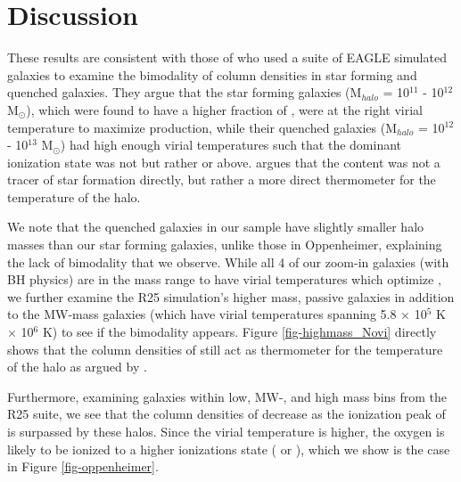 \documentclass[]{emulateapj}
\begin{document}

\section{Discussion} 
\label{sec-discuss}

These results are consistent with those of \cite{Oppenheimer2016} who used a suite of EAGLE simulated galaxies to examine the bimodality of  column densities \citep[further discussed in][]{Tumlinson2011} in star forming and quenched galaxies. They argue that the star forming galaxies (M$_{halo}$ = 10$^{11}$ - 10$^{12}$ M$_{\odot}$), which were found to have a higher fraction of , were at the right virial temperature to maximize  production, while their quenched galaxies (M$_{halo}$ = 10$^{12}$ - 10$^{13}$ M$_{\odot}$) had high enough virial temperatures such that the dominant ionization state was not  but rather  or above. \cite{Oppenheimer2016} argues that the  content was not a tracer of star formation directly, but rather a more direct thermometer for the temperature of the halo.

We note that the quenched galaxies in our sample have slightly smaller halo masses than our star forming galaxies, unlike those in Oppenheimer, explaining the lack of bimodality that we observe. While all 4 of our zoom-in galaxies (with BH physics) are in the mass range to have virial temperatures which optimize , we further examine the R25 simulation's higher mass, passive galaxies in addition to the MW-mass galaxies (which have virial temperatures spanning 5.8 $\times$ 10$^{5}$ K  $\times$ 10$^{6}$ K) to see if the bimodality appears. Figure \ref{fig-highmass_Novi} directly shows that the column densities of  still act as thermometer for the temperature of the halo as argued by \cite{Oppenheimer2016}.

Furthermore, examining galaxies within low, MW-, and high mass bins from the R25 suite, we see that the column densities of  decrease as the ionization peak of  is surpassed by these halos. Since the virial temperature is higher, the oxygen is likely to be ionized to a higher ionizations state ( or ), which we show is the case in Figure \ref{fig-oppenheimer}. 
\end{document}
